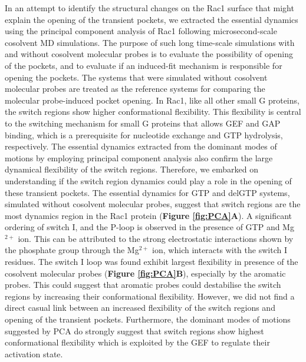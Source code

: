 \documentclass[12pt,a4paper]{achemso}
\begin{document}
In an attempt to identify the structural changes on the Rac1 surface that might explain the opening of the transient pockets, we extracted the essential dynamics using the principal component analysis of Rac1 following microsecond-scale cosolvent MD simulations. The purpose of such long time-scale simulations with and without cosolvent molecular probes is to evaluate the possibility of opening of the pockets, and to evaluate if an induced-fit mechanism is responsible for opening the pockets. The systems that were simulated without cosolvent molecular probes are treated as the reference systems for comparing the molecular probe-induced pocket opening.  In Rac1, like all other small G proteins, the switch regions show higher conformational flexibility. This flexibility is central to the switching mechanism for small G proteins that allows GEF and GAP binding, which is a prerequisite for nucleotide exchange and GTP hydrolysis, respectively.  The essential dynamics extracted from the dominant modes of motions by employing principal component analysis also confirm the large dynamical flexibility of the switch regions.  Therefore, we embarked on understanding if the switch region dynamics could play a role in the opening of these transient pockets. The essential dynamics for GTP and delGTP systems, simulated without cosolvent molecular probes, suggest that switch regions are the most dynamics region in the Rac1 protein (\textbf{Figure \ref{fig:PCA}A}). A significant ordering of switch I, and the P-loop is observed in the presence of GTP and Mg$^{2+}$ ion. This can be attributed to the strong electrostatic interactions shown by the phosphate group through the  Mg$^{2+}$ ion, which interacts with the switch I residues. The switch I loop was found exhibit largest flexibility in presence of the cosolvent molecular probes (\textbf{Figure \ref{fig:PCA}B}), especially by the aromatic probes. This could suggest that aromatic probes could destabilise the switch regions by increasing their conformational flexibility. However, we did not find a direct casual link between an increased flexibility of the switch regions and opening of the transient pockets. Furthermore, the dominant modes of motions suggested by PCA do strongly suggest that switch regions show highest conformational flexibility which is exploited by the GEF to regulate their activation state.
\end{document}
